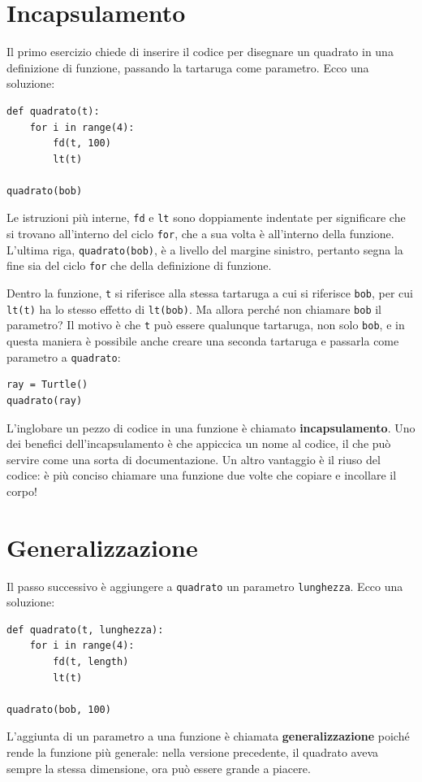 \documentclass[10pt]{book}
\begin{document}
\section{Incapsulamento}

Il primo esercizio chiede di inserire il codice per disegnare un quadrato in una definizione di funzione, passando la tartaruga come parametro. Ecco una soluzione:

\begin{verbatim}
def quadrato(t):
    for i in range(4):
        fd(t, 100)
        lt(t)

quadrato(bob)
\end{verbatim}
%
Le istruzioni più interne, {\tt fd} e {\tt lt} sono doppiamente indentate per significare che si trovano all'interno del ciclo {\tt for}, che a sua volta è all'interno della funzione. L'ultima riga, {\tt quadrato(bob)}, è a livello del margine sinistro, pertanto segna la fine sia del ciclo {\tt for} che della definizione di funzione.

Dentro la funzione, {\tt t} si riferisce alla stessa tartaruga a cui si riferisce {\tt bob}, per cui {\tt lt(t)} ha lo stesso effetto di {\tt lt(bob)}.
Ma allora perché non chiamare {\tt bob} il parametro? Il motivo è che {\tt t}
può essere qualunque tartaruga, non solo {\tt bob}, e in questa maniera è possibile anche creare una seconda tartaruga e passarla come parametro a {\tt quadrato}:

\begin{verbatim}
ray = Turtle()
quadrato(ray)
\end{verbatim}
%
L'inglobare un pezzo di codice in una funzione è chiamato {\bf incapsulamento}. Uno dei benefici dell'incapsulamento è che appiccica un nome al codice, il che può servire come una sorta di documentazione. Un altro vantaggio è il riuso del codice: è più conciso chiamare una funzione due volte che copiare e incollare il corpo!


\section{Generalizzazione}

Il passo successivo è aggiungere a {\tt quadrato} un parametro {\tt lunghezza}.
Ecco una soluzione:

\begin{verbatim}
def quadrato(t, lunghezza):
    for i in range(4):
        fd(t, length)
        lt(t)

quadrato(bob, 100)
\end{verbatim}
%
L'aggiunta di un parametro a una funzione è chiamata {\bf generalizzazione}
poiché rende la funzione più generale: nella versione precedente, il quadrato aveva sempre la stessa dimensione, ora può essere grande a piacere.
\end{document}
